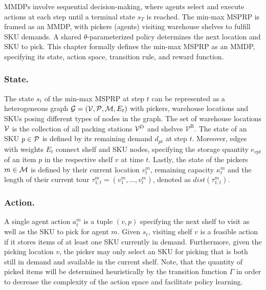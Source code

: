 MMDPs involve sequential decision-making, where agents select and execute actions at each step until a terminal state $s_T$ is reached. The min-max MSPRP is framed as an MMDP, with pickers (agents) visiting warehouse shelves to fulfill SKU demands. A shared $\theta$-parameterized policy determines the next location and SKU to pick. This chapter formally defines the min-max MSPRP as an MMDP, specifying its state, action space, transition rule, and reward function.


\vspace{-4.5mm}
\subsubsection{State.} 
The state $s_t$ of the min-max MSPRP at step $t$ can be represented as a heterogeneous graph $\mathcal{G}=(\mathcal{V},\mathcal{P}, \mathcal{M}, E_{t})$ with pickers, warehouse locations and SKUs posing different types of nodes in the graph. 
The set of warehouse locations $\mathcal{V}$ is the collection of all packing stations $\mathcal{V}^{\text{D}}$ and shelves $\mathcal{V}^\text{R}$. 
The state of an SKU $p \in \mathcal{P}$ is defined by its remaining demand $d_{pt}$ at step $t$. 
Moreover, edges with weights $E_t$ connect shelf and SKU nodes, specifying the storage quantity $e_{vpt}$ of an item $p$ in the respective shelf $v$ at time $t$. 
Lastly, the state of the pickers $m \in \mathcal{M}$ is defined by their current location $v^m_{t}$, remaining capacity $\kappa^m_{t}$ and the length of their current tour $\tau^m_{1:t}=(v_1^m,\ldots,v_t^m)$, denoted as $dist(\tau^m_{1:t})$.
\vspace{-4.5mm}
\subsubsection{Action.} 
A single agent action $a^m_{t}$ is a tuple $(v,p)$ specifying the next shelf to visit as well as the SKU to pick for agent $m$. Given $s_t$, visiting shelf $v$ is a feasible action if it stores items of at least one SKU currently in demand. Furthermore, given the picking location $v$, the picker may only select an SKU for picking that is both still in demand and available in the current shelf. Note, that the quantity of picked items will be determined heuristically by the transition function $\Gamma$ in order to decrease the complexity of the action space and facilitate policy learning. 

